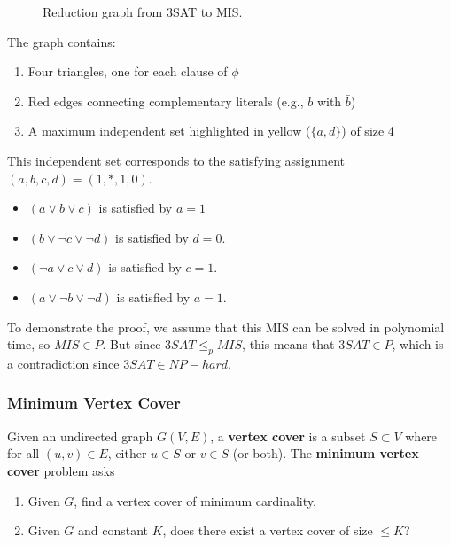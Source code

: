 \begin{example}
\begin{figure}[H]
        \caption{Reduction graph from 3SAT to MIS. } 
        \label{fig:mis_graph}
      \end{figure}

      The graph contains:
      \begin{enumerate}
        \item Four triangles, one for each clause of $\phi$
        \item Red edges connecting complementary literals (e.g., $b$ with $\bar{b}$)
        \item A maximum independent set highlighted in yellow ($\{a, d\}$) of size 4
      \end{enumerate} 

      This independent set corresponds to the satisfying assignment $(a, b, c, d) = (1, \ast, 1, 0)$. 
      \begin{itemize}
        \item $(a \lor b \lor c)$ is satisfied by $a = 1$
        \item $(b \lor \neg c \lor \neg d)$ is satisfied by $d = 0$. 
        \item $(\neg a \lor c \lor d)$ is satisfied by $c = 1$. 
        \item $(a \lor \neg b \lor \neg d)$ is satisfied by $a = 1$. 
      \end{itemize}

      To demonstrate the proof, we assume that this MIS can be solved in polynomial time, so $MIS \in P$. But since $3SAT \leq_p MIS$, this means that $3SAT \in P$, which is a contradiction since $3SAT \in NP-hard$. 
    \end{example} 

  \subsubsection{Minimum Vertex Cover}

    \begin{definition}
      \label{def:min-vertex-cover}
      Given an undirected graph $G(V, E)$, a \textbf{vertex cover} is a subset $S \subset V$ where for all $(u, v) \in E$, either $u \in S$ or $v \in S$ (or both). The \textbf{minimum vertex cover} problem asks 
      \begin{enumerate}
        \item Given $G$, find a vertex cover of minimum cardinality. 
        \item Given $G$ and constant $K$, does there exist a vertex cover of size $\leq K$? 
      \end{enumerate}
    \end{definition}

